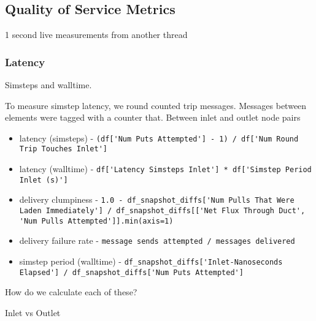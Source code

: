 \subsection{Quality of Service Metrics}

1 second live measurements from another thread



\subsubsection{Latency}

Simsteps and walltime.

To measure simstep latency, we round counted trip messages.
Messages between elements were tagged with a counter that.
Between inlet and outlet node pairs

\begin{itemize}
  \item latency (simsteps)
    - \verb|(df['Num Puts Attempted'] - 1) / df['Num Round Trip Touches Inlet']|
  \item latency (walltime)
    - \verb|df['Latency Simsteps Inlet'] * df['Simstep Period Inlet (s)']|
  \item delivery clumpiness
    - \verb|1.0 - df_snapshot_diffs['Num Pulls That Were Laden Immediately'] / df_snapshot_diffs[['Net Flux Through Duct', 'Num Pulls Attempted']].min(axis=1)|
  \item delivery failure rate
    - \verb|message sends attempted / messages delivered|
  \item simstep period (walltime)
    - \verb|df_snapshot_diffs['Inlet-Nanoseconds Elapsed'] / df_snapshot_diffs['Num Puts Attempted']|
\end{itemize}

How do we calculate each of these?

Inlet vs Outlet
